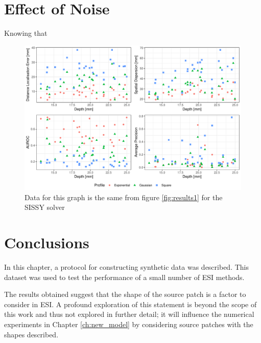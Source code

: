 \section{Effect of Noise}

Knowing that 

\begin{figure}
    \centering
    \includegraphics[width=0.9\linewidth]{img_stats/SISSY_scatter_EvalMetrics_Protocol04_30.pdf}
    \caption{Data for this graph is the same from figure \ref{fig:results1} for the SISSY solver}
    \label{fig:noise_degradation}
\end{figure}

\section{Conclusions}

In this chapter, a protocol for constructing synthetic data was described.
%
This dataset was used to test the performance of a small number of ESI methods.

The results obtained suggest that the shape of the source patch is a factor to consider in ESI.
%
A profound exploration of this statement is beyond the scope of this work and thus not explored in further detail;
it will influence the numerical experiments in Chapter \ref{ch:new_model} by considering source patches with the shapes described.

